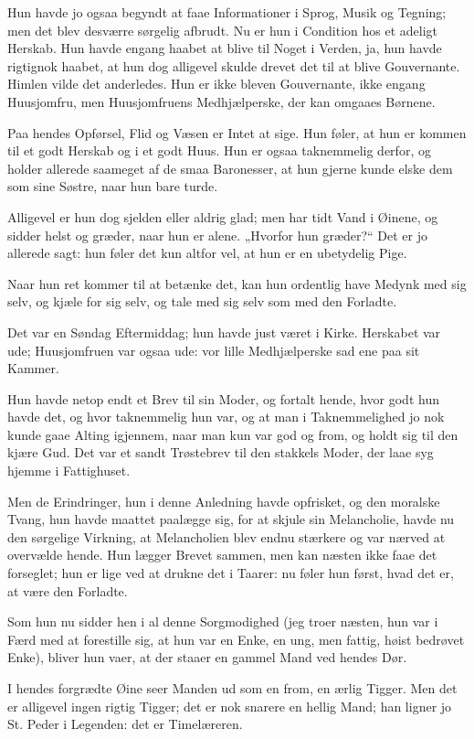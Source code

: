 \documentclass[12pt,a4paper]{book}
\newcommand{\apage}[1]{\marginnote{\footnotesize\textit{[#1]}}}
\begin{document}
Hun havde jo ogsaa begyndt at faae Informationer i Sprog, Musik og
Tegning; men det blev desværre sørgelig afbrudt. Nu er hun i
Condition hos et adeligt Herskab. Hun havde engang haabet at blive
til Noget i Verden, ja, hun havde rigtignok haabet, at hun dog
alligevel skulde drevet det til at blive Gouvernante. Himlen vilde
det anderledes. Hun er ikke bleven Gouvernante, ikke engang
Huusjomfru, men Huusjomfruens Medhjælperske, der kan omgaaes
Børnene.

Paa hendes Opførsel, Flid og Væsen er Intet at sige. Hun føler, at
hun er kommen til et godt Herskab og i et godt Huus. Hun er ogsaa
taknemmelig derfor, og holder allerede saameget af de smaa
Baronesser, at hun gjerne kunde elske dem som sine Søstre, naar hun
bare turde.

Alligevel er hun dog sjelden eller aldrig glad; men har tidt Vand i
Øinene, og sidder helst og græder, naar hun er alene. „Hvorfor hun
græder?“ Det er jo allerede sagt: hun føler det kun altfor vel, at
hun er en ubetydelig Pige.

Naar hun ret kommer til at betænke det, kan hun ordentlig have
Medynk med sig selv, og kjæle for sig selv, og tale med sig selv
som med den Forladte.

Det var en Søndag Eftermiddag; hun havde just været i Kirke.
Herskabet var ude; Huusjomfruen var ogsaa ude: vor lille
Medhjælperske sad ene paa sit Kammer.

Hun havde netop endt et Brev til sin Moder, og fortalt hende, hvor
godt hun havde det, og hvor taknemmelig hun var, og at man i
Taknemmelighed jo nok kunde gaae Alting igjennem, naar man kun var
god og from, og holdt sig til den kjære Gud. Det var et sandt
Trøstebrev til den stakkels Moder, der laae syg hjemme i
Fattighuset.

Men de Erindringer, hun i denne Anledning havde opfrisket, og den
moralske Tvang, hun havde maattet paalægge \apage{87}
sig, for at skjule sin Melancholie, havde nu den sørgelige
Virkning, at Melancholien blev endnu stærkere og var nærved at
overvælde hende. Hun lægger Brevet sammen, men kan næsten ikke
faae det forseglet; hun er lige ved at drukne det i Taarer: nu
føler hun først, hvad det er, at være den Forladte.

Som hun nu sidder hen i al denne Sorgmodighed (jeg troer næsten,
hun var i Færd med at forestille sig, at hun var en Enke, en ung,
men fattig, høist bedrøvet Enke), bliver hun vaer, at der staaer en
gammel Mand ved hendes Dør.

I hendes forgrædte Øine seer Manden ud som en from, en ærlig
Tigger. Men det er alligevel ingen rigtig Tigger; det er nok
snarere en hellig Mand; han ligner jo St. Peder i Legenden: det er
Timelæreren.
\end{document}

